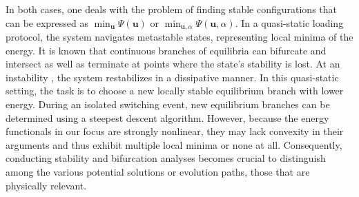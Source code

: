 In both cases, one deals with the problem of finding  stable configurations that  can be expressed as $\min_{\boldsymbol{u}} \Psi(\boldsymbol{u})$ or $\min_{\boldsymbol{u},\alpha} \Psi(\boldsymbol{u},\alpha)$.  In a quasi-static loading protocol, the system navigates metastable states, representing local minima of the energy. 
It is known that continuous branches of equilibria can bifurcate and intersect as well as terminate at points where the state's stability is lost. 
At an instability , the system restabilizes  in a dissipative manner.
In this quasi-static setting, the task is to choose a new locally stable equilibrium branch with lower energy. 
During an isolated switching event, new equilibrium branches can be determined using a steepest descent algorithm. However, because the energy functionals in our focus are strongly nonlinear, they may lack convexity in their arguments and thus exhibit multiple local minima or none at all. Consequently, conducting stability and bifurcation analyses becomes crucial to distinguish among the various potential solutions or evolution paths, those that are physically relevant.
